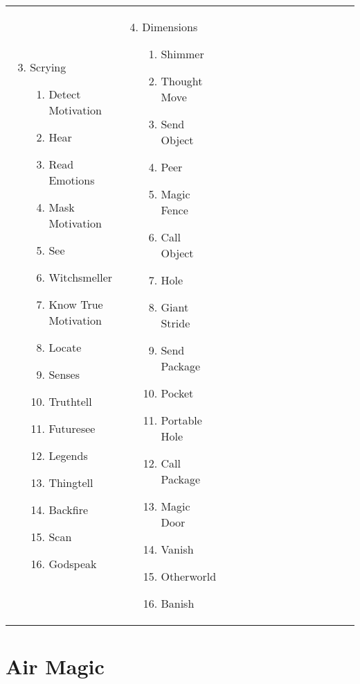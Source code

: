 \begin{tabular}{@{} p{0.25\linewidth} p{0.25\linewidth} p{0.25\linewidth} p{0.25\linewidth}}
\begin{enumerate}
	\setcounter{enumi}{2}
	\item Scrying
	\begin{enumerate}
		\item Detect Motivation
		\item Hear
		\item Read Emotions
		\item Mask Motivation
		\item See
		\item Witchsmeller
		\item Know True Motivation
		\item Locate
		\item Senses
		\item Truthtell
		\item Futuresee
		\item Legends
		\item Thingtell
		\item Backfire
		\item Scan
		\item Godspeak
	\end{enumerate}
\end{enumerate} &
\begin{enumerate}
	\setcounter{enumi}{3}
	\item Dimensions
	\begin{enumerate}
		\item Shimmer
		\item Thought Move
		\item Send Object
		\item Peer
		\item Magic Fence
		\item Call Object
		\item Hole
		\item Giant Stride
		\item Send Package
		\item Pocket
		\item Portable Hole
		\item Call Package
		\item Magic Door
		\item Vanish
		\item Otherworld
		\item Banish
	\end{enumerate}
\end{enumerate} \\
\end{tabular}
\pagebreak
\section{Air Magic}

